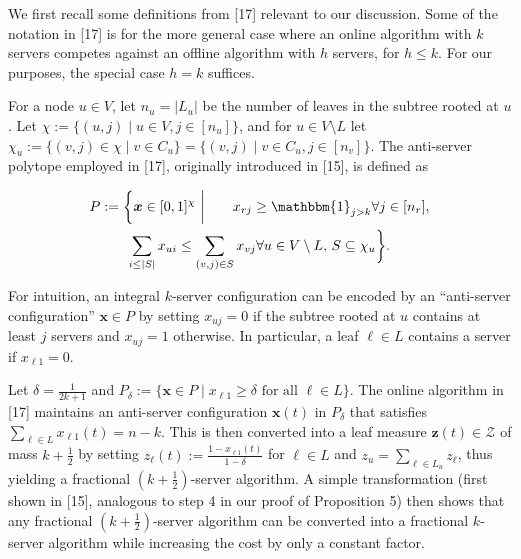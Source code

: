 \documentclass[10pt,a4paper]{article}
\begin{document}
We first recall some definitions from [17] relevant to our discussion.
Some of the notation in [17] is for the more general case where an online algorithm with $k$ servers competes against an offline algorithm with $h$ servers, for $h\leq k$. For our purposes, the special case $h=k$ suffices.\par




For a node $u\in V$, let $n_{u}=|L_{u}|$ be the number of leaves in the subtree rooted at $u$. Let $\chi:=\{(u,j)\mid u\in V,j\in[n_{u}]\}$, and for $u\in V\setminus L$ let $\chi_{u}:=\{(v,j)\in\chi\mid v\in C_{u}\}=\{(v,j)\mid v\in C_{u},j\in[n_{v}]\}$. The anti-server polytope employed in [17], originally introduced in [15], is defined as\par


\[\begin{gathered}
\displaystyle P:=\bigg\{{\boldsymbol{x}}\in[0,1]^{\chi}\,\,\bigg|\qquad x_{rj} \displaystyle\geq\mathbbm{1}_{j>k} \displaystyle\forall j\in[n_{r}], \\
\displaystyle\sum_{i\leq|S|}x_{ui} \displaystyle\leq\sum_{(v,j)\in S}x_{vj} \displaystyle\forall u\in V\setminus L,\,S\subseteq\chi_{u}\bigg\}.
\end{gathered}\]


For intuition, an integral $k$-server configuration can be encoded by an “anti-server configuration” ${\boldsymbol{x}}\in P$ by setting $x_{uj}=0$ if the subtree rooted at $u$ contains at least $j$ servers and $x_{uj}=1$ otherwise. In particular, a leaf $\ell\in L$ contains a server if $x_{\ell 1}=0$.\par




Let $\delta=\frac{1}{2k+1}$ and $P_{\delta}:=\{{\boldsymbol{x}}\in P\mid x_{\ell 1}\geq\delta\text{ for all }\ell\in L\}$. The online algorithm in [17] maintains an anti-server configuration ${\boldsymbol{x}}(t)$ in $P_{\delta}$ that satisfies $\sum_{\ell\in L}x_{\ell 1}(t)=n-k$. This is then converted into a leaf measure ${\mathbf{z}}(t)\in\mathcal{Z}$ of mass $k+\frac{1}{2}$ by setting $z_{\ell}(t):=\frac{1-x_{\ell 1}(t)}{1-\delta}$ for $\ell\in L$ and $z_{u}=\sum_{\ell\in L_{u}}z_{\ell}$, thus yielding a fractional $\left(k+\frac{1}{2}\right)$-server algorithm. A simple transformation (first shown in [15], analogous to step 4 in our proof of Proposition 5) then shows that any fractional $\left(k+\frac{1}{2}\right)$-server algorithm can be converted into a fractional $k$-server algorithm while increasing the cost by only a constant factor.\par
\end{document}
